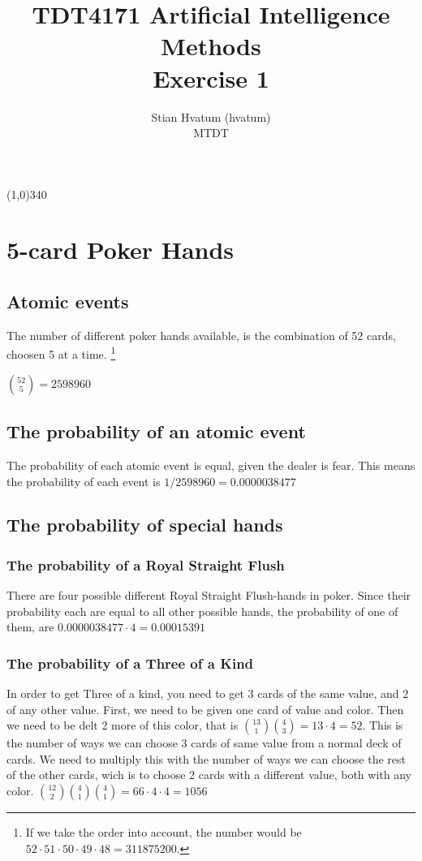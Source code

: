 \documentclass[english]{article}
\title{TDT4171 Artificial Intelligence Methods\\
\Huge Exercise 1}
\author{Stian Hvatum (hvatum)\\MTDT}
\begin{document}
\maketitle
\line(1,0){340} %
\section{5-card Poker Hands}
\subsection{Atomic events}
The number of different poker hands available, is the combination of 52 cards,
choosen 5 at a time. \footnote{If we take
the order into account, the number would be \(52 \cdot 51 \cdot 50 \cdot 49 \cdot
48 = 311875200\). }

\({{52}\choose{5}} = 2598960\)

\subsection{The probability of an atomic event}
The probability of each atomic event is equal, given the dealer is fear. This
means the probability of each event is
\(1/2598960 = 0.0000038477\)

\subsection{The probability of special hands}
\subsubsection{The probability of a Royal Straight Flush}
There are four possible different Royal Straight Flush-hands in poker. Since
their probability each are equal to all other possible hands, the probability of
one of them, are \(0.0000038477 \cdot 4 = 0.00015391\)

\subsubsection{The probability of a Three of a Kind}
In order to get Three of a kind, you need to get 3 cards of the same value, and
2 of any other value. First, we need to be given one card of value and color.
Then we need to be delt 2 more of this color, that is
\({{13}\choose{1}}{{4}\choose{3}} = 13 \cdot 4 = 52\). This is the number of
ways we can choose 3 cards of same value from a normal deck of cards. We need to
multiply this with the number of ways we can choose the rest of the other cards,
wich is to choose 2 cards with a different value, both with any color.
\({{12}\choose{2}}{{4}\choose{1}}{{4}\choose{1}} = 66 \cdot 4 \cdot 4 = 1056\)
\end{document}
